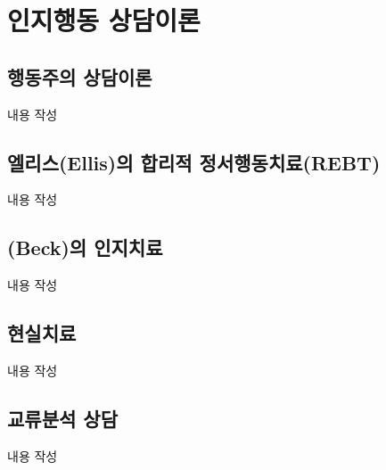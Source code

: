 \section{인지행동 상담이론}

\subsection{행동주의 상담이론}
내용 작성

\subsection{엘리스(Ellis)의 합리적 정서행동치료(REBT)}
내용 작성

\subsection{(Beck)의 인지치료}
내용 작성

\subsection{현실치료}
내용 작성

\subsection{교류분석 상담}
내용 작성
